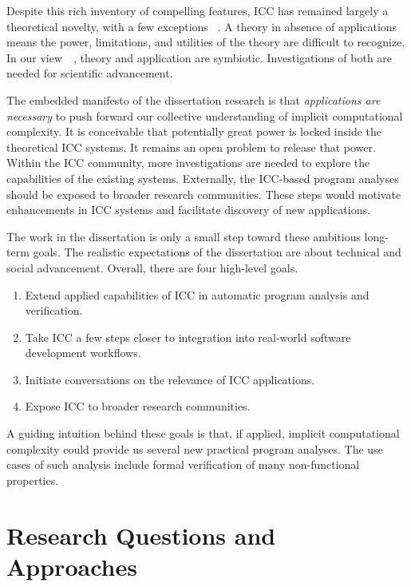 Despite this rich inventory of compelling features, ICC has remained largely a
theoretical novelty, with a few exceptions%
~\cite{avanzini2017,avanzini2008,moyen20172,hainry2021,hoffmann2012,feree2018}.
A theory in absence of applications means the power, limitations, and utilities
of the theory are difficult to recognize. In our view~\cite[p.
xxxv]{bishop2003}~\cite[p. 75]{moyen2017}, theory and application are
{symbiotic}. Investigations of both are needed for scientific advancement.

The embedded manifesto of the dissertation research is that \emph{applications
are necessary} to push forward our collective understanding of implicit
computational complexity. It is conceivable that potentially great power is
locked inside the theoretical ICC systems. It remains an open problem to release
that power. Within the ICC community, more investigations are needed to explore
the capabilities of the existing systems. Externally, the ICC-based program
analyses should be exposed to broader research communities. These steps would
motivate enhancements in ICC systems and facilitate discovery of new
applications.

The work in the dissertation is only a small step toward these ambitious
long-term goals. The realistic expectations of the dissertation are about
technical and social advancement. Overall, there are four high-level goals.
\begin{enumerate}
\item Extend {applied} capabilities of ICC in automatic program analysis and
verification.
\item Take ICC a few steps closer to integration into real-world software
development workflows.
\item Initiate conversations on the relevance of ICC applications.
\item Expose ICC to broader research communities.
\end{enumerate}
A guiding intuition behind these goals is that, {if applied}, implicit
computational complexity could provide us several new practical program
analyses. The use cases of such analysis include formal verification of many
non-functional properties.

\section{Research Questions and Approaches}
\label{sec:aicc-approaches}

